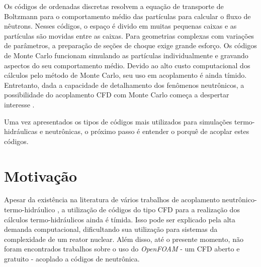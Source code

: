 Os códigos de ordenadas discretas resolvem 
a equação de transporte de Boltzmann para o comportamento médio das partículas para calcular o 
fluxo de nêutrons. Nesses códigos, o espaço é divido em muitas pequenas caixas e as partículas 
são movidas entre as caixas. Para geometrias complexas com variações de parâmetros, a preparação de 
seções de choque exige grande esforço. Os códigos de Monte Carlo funcionam simulando as partículas 
individualmente e gravando aspectos do seu comportamento médio. Devido ao alto custo computacional 
dos cálculos pelo método de Monte Carlo, seu uso em acoplamento é ainda tímido. Entretanto, dada a capacidade de detalhamento dos fenômenos neutrônicos, a possibilidade do acoplamento CFD com Monte Carlo começa a despertar interesse \cite{Leppanen2012}.

Uma vez apresentados os tipos de códigos mais utilizados para simulações termo-hidráulicas
e neutrônicas, o próximo passo é entender o porquê de acoplar estes códigos.

%

\section{Motivação}

Apesar da existência na literatura de vários trabalhos de acoplamento neutrônico-termo-hidráulico \cite{Faghihi2011}, 
a utilização de códigos do tipo CFD para a realização dos cálculos 
termo-hidráulicos ainda é tímida. Isso pode ser explicado pela alta demanda
computacional, dificultando sua utilização para sistemas da complexidade de um
reator nuclear. Além disso, até o presente momento, não
foram encontrados trabalhos
sobre o uso do \textit{OpenFOAM} - 
um CFD aberto e gratuito \cite{Jasak2007} - acoplado a códigos de neutrônica.

